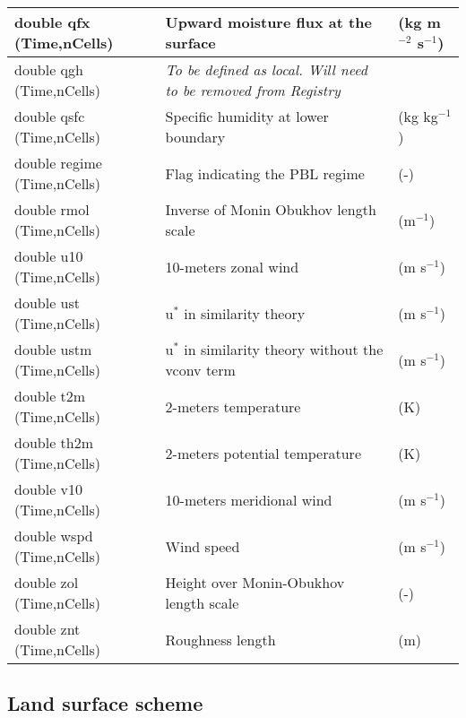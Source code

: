 {\begin{longtable}{|p{2.0in} |p{3.0in} |p{1.0in} |}
double qfx (Time,nCells) & Upward moisture flux at the surface & (kg m$^{-2}$ s$^{-1}$) \\ \hline
double qgh (Time,nCells) & \em{To be defined as local. Will need to be removed from Registry} & \\ \hline
double qsfc (Time,nCells) & Specific humidity at lower boundary & (kg kg$^{-1}$) \\ \hline
double regime (Time,nCells) & Flag indicating the PBL regime & (-) \\ \hline
double rmol (Time,nCells) & Inverse of Monin Obukhov length scale & (m$^{-1}$) \\ \hline
double u10 (Time,nCells) & 10-meters zonal wind & (m s$^{-1}$) \\ \hline
double ust (Time,nCells) & u$^{*}$ in similarity theory & (m s$^{-1}$) \\ \hline
double ustm (Time,nCells) & u$^{*}$ in similarity theory without the vconv term & (m s$^{-1}$) \\ \hline
double t2m (Time,nCells) & 2-meters temperature & (K) \\ \hline
double th2m (Time,nCells) & 2-meters potential temperature & (K) \\ \hline
double v10 (Time,nCells) & 10-meters meridional wind & (m s$^{-1}$) \\ \hline
double wspd (Time,nCells) & Wind speed & (m s$^{-1}$) \\ \hline
double zol (Time,nCells) & Height over Monin-Obukhov length scale & (-) \\ \hline
double znt (Time,nCells) & Roughness length & (m) \\ \hline
\end{longtable}
}

\subsection{Land surface scheme}

